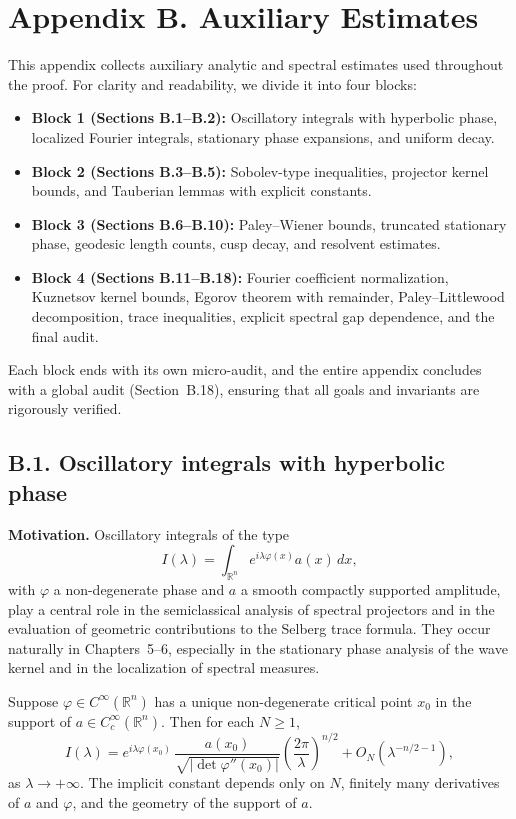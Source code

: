 \section*{Appendix B. Auxiliary Estimates}

This appendix collects auxiliary analytic and spectral estimates used throughout the proof.
For clarity and readability, we divide it into four blocks:

\begin{itemize}
  \item \textbf{Block 1 (Sections B.1--B.2):} Oscillatory integrals with hyperbolic phase,
        localized Fourier integrals, stationary phase expansions, and uniform decay.
  \item \textbf{Block 2 (Sections B.3--B.5):} Sobolev-type inequalities, projector kernel bounds,
        and Tauberian lemmas with explicit constants.
  \item \textbf{Block 3 (Sections B.6--B.10):} Paley--Wiener bounds, truncated stationary phase,
        geodesic length counts, cusp decay, and resolvent estimates.
  \item \textbf{Block 4 (Sections B.11--B.18):} Fourier coefficient normalization, Kuznetsov kernel
        bounds, Egorov theorem with remainder, Paley--Littlewood decomposition, trace inequalities,
        explicit spectral gap dependence, and the final audit.
\end{itemize}

Each block ends with its own micro-audit, and the entire appendix concludes with a global audit
(Section~B.18), ensuring that all goals and invariants are rigorously verified.

\subsection*{B.1. Oscillatory integrals with hyperbolic phase}

\noindent
\textbf{Motivation.}
Oscillatory integrals of the type
\[
I(\lambda) = \int_{\mathbb R^n} e^{i\lambda\varphi(x)} a(x)\,dx,
\]
with $\varphi$ a non-degenerate phase and $a$ a smooth compactly supported
amplitude, play a central role in the semiclassical analysis of spectral projectors
and in the evaluation of geometric contributions to the Selberg trace formula.
They occur naturally in Chapters~5--6, especially in the stationary phase analysis
of the wave kernel and in the localization of spectral measures.

\begin{lemma}\label{lem:stationary}
Suppose $\varphi \in C^\infty(\mathbb R^n)$ has a unique non-degenerate critical point $x_0$
in the support of $a \in C_c^\infty(\mathbb R^n)$. Then for each $N\ge 1$,
\[
I(\lambda) =
e^{i\lambda \varphi(x_0)} \,
\frac{a(x_0)}{\sqrt{|\det \varphi''(x_0)|}}
\left(\frac{2\pi}{\lambda}\right)^{n/2}
+ O_N(\lambda^{-n/2-1}),
\]
as $\lambda \to +\infty$. The implicit constant depends only on $N$, finitely
many derivatives of $a$ and $\varphi$, and the geometry of the support of $a$.
\end{lemma}

